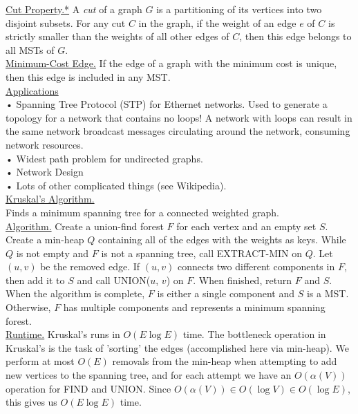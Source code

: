 \documentclass[12pt, fleqn]{general}
\begin{document}
\begin{multicols*}{2}
    \underline{Cut Property.*} A \emph{cut} of a graph $G$ is a partitioning of its vertices into two disjoint subsets. For any cut $C$ in the graph, if the weight of an edge $e$ of $C$ is strictly smaller than the weights of all other edges of $C$, then this edge belongs to all MSTs of $G$.\\

    \underline{Minimum-Cost Edge.} If the edge of a graph with the minimum cost is unique, then this edge is included in any MST.\\

    \underline{Applications}\\

    • Spanning Tree Protocol (STP) for Ethernet networks. Used to generate a topology for a network that contains no loops! A network with loops can result in the same network broadcast messages circulating around the network, consuming network resources.\\
    • Widest path problem for undirected graphs.\\
    • Network Design\\
    • Lots of other complicated things (see Wikipedia).\\

    {\large \underline{Kruskal's Algorithm.}}\\

    Finds a minimum spanning tree for a connected weighted graph.\\

    \underline{Algorithm.} Create a union-find forest $F$ for each vertex and an empty set $S$. Create a min-heap $Q$ containing all of the edges with the weights as keys. While $Q$ is not empty and $F$ is not a spanning tree, call EXTRACT-MIN on $Q$. Let $(u, v)$ be the removed edge. If $(u, v)$ connects two different components in $F$, then add it to $S$ and call UNION($u$, $v$) on $F$. When finished, return $F$ and $S$.\\

    When the algorithm is complete, $F$ is either a single component and $S$ is a MST. Otherwise, $F$ has multiple components and represents a minimum spanning forest.\\

    \underline{Runtime.} Kruskal's runs in $O(E \log E)$ time. The bottleneck operation in Kruskal's is the task of 'sorting' the edges (accomplished here via min-heap). We perform at most $O(E)$ removals from the min-heap when attempting to add new vertices to the spanning tree, and for each attempt we have an $O(\alpha(V))$ operation for FIND and UNION. Since $O(\alpha(V)) \in O(\log V) \in O(\log E)$, this gives us $O(E \log E)$ time.\\


\end{multicols*}
\end{document}
